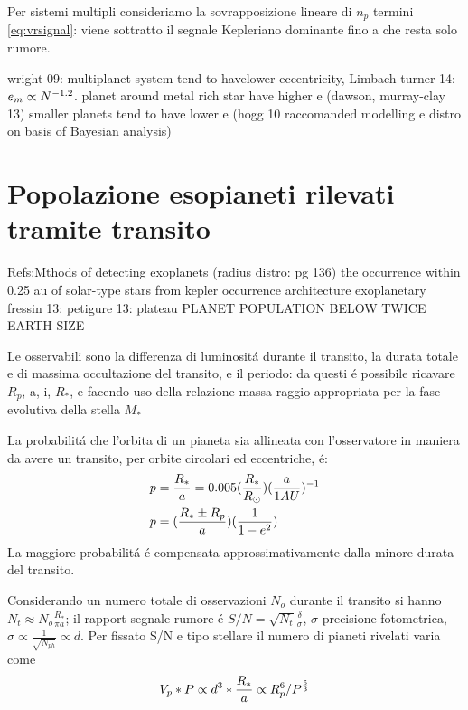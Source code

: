 Per sistemi multipli consideriamo la sovrapposizione lineare di $n_p$ termini \eqref{eq:vrsignal}: viene sottratto il segnale Kepleriano dominante fino a che resta solo rumore.

\begin{workout}
wright 09: multiplanet system tend to havelower eccentricity,
Limbach turner 14: $e_m\propto N^{-1.2}$.
planet around metal rich star have higher e (dawson, murray-clay 13)
smaller planets tend to have lower e (hogg 10 raccomanded modelling e distro on basis of Bayesian analysis)
\end{workout}	

\section{Popolazione esopianeti rilevati tramite transito}

\begin{workout}
Refs:Mthods of detecting exoplanets (radius distro: pg 136)
the occurrence within 0.25 au of solar-type stars from kepler
occurrence architecture exoplanetary
fressin 13: 
petigure 13: plateau PLANET POPULATION BELOW TWICE EARTH SIZE
\end{workout}

Le osservabili sono la differenza di luminosit\'a durante il transito, la durata totale e di massima occultazione del transito, e il periodo: da questi \'e possibile ricavare $R_p$, a, i, $R_*$, e facendo uso della relazione massa raggio appropriata per la fase evolutiva della stella $M_*$

La probabilit\'a che l'orbita di un pianeta sia allineata con l'osservatore in maniera da avere un transito, per orbite circolari ed eccentriche, \'e:
\begin{align*}
&p=\frac{R_*}{a}=0.005(\frac{R_*}{R_{\odot}{}})(\frac{a}{1AU})^{-1}\\
&p=(\frac{R_*\pm R_p}{a})(\frac{1}{1-e^2})
\end{align*}
La maggiore probabilit\'a \'e compensata approssimativamente dalla minore durata del transito.

\begin{workout}
Considerando un numero totale di osservazioni $N_o$ durante il transito si hanno $N_t\approx N_o\frac{R_*}{\pi a}$; il rapport segnale rumore \'e $S/N=\sqrt{N_t}\frac{\delta}{\sigma}$, $\sigma$ precisione fotometrica, $\sigma\propto\frac{1}{\sqrt{N_{ph}}}\propto d$. Per fissato S/N e tipo stellare il numero di pianeti rivelati varia come
\begin{equation}
V_p*P\propto d^3*\frac{R_*}{a}\propto R_p^6/P^{\frac{5}{3}}
\end{equation}
\end{workout}

